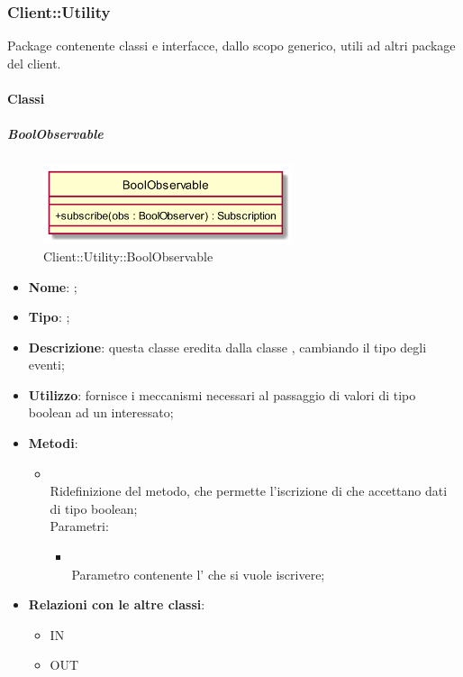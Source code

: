 \subsubsection{Client::Utility}
Package contenente classi e interfacce, dallo scopo generico, utili ad altri package del client.
\paragraph{Classi}
\hypertarget{BoolObservable_label}{\subparagraph{BoolObservable}}
\begin{figure}[h]
	\centering
	\includegraphics[width=0.65\textwidth,height=\textheight,keepaspectratio]{images/ClassBoolObservable.png}
	\caption{Client::Utility::BoolObservable}
\end{figure}
\begin{itemize}
	\item \textbf{Nome}: ;
	\item \textbf{Tipo}: ;
	\item \textbf{Descrizione}: questa classe eredita dalla classe , cambiando il tipo degli eventi;
	\item \textbf{Utilizzo}: fornisce i meccanismi necessari al passaggio di valori di tipo boolean ad un  interessato;
	\item \textbf{Metodi}:
	\begin{itemize}
		\item[]  \\		Ridefinizione del metodo, che permette l'iscrizione di  che accettano dati di tipo boolean;\\
		Parametri:
		\begin{itemize}
			\item {} \\
			Parametro contenente l' che si vuole iscrivere;
		\end{itemize}
	\end{itemize}
	\item \textbf{Relazioni con le altre classi}:
	\begin{itemize}
		\item IN \hyperlink{Player_label}{}
		\item OUT \hyperlink{BoolObserver_label}{}
	\end{itemize}
\end{itemize}
\FloatBarrier

